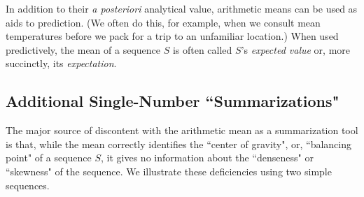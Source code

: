 \bigskip

In addition to their {\em a posteriori} analytical value, arithmetic means can be used as aids to prediction.  (We often do this, for example, when we consult mean temperatures before we pack for a trip to an unfamiliar location.)  When used predictively, the mean of a sequence $S$ is often called $S$'s {\it expected value} or, more succinctly, its {\it expectation}.
 

\subsection{Additional Single-Number ``Summarizations"}
\label{sec:median-mode}

The major source of discontent with the arithmetic mean as a summarization tool is that, while the mean correctly identifies the ``center of gravity", or, ``balancing point" of a sequence $S$, it gives no information about the ``denseness" or ``skewness" of the sequence.  We illustrate these deficiencies using two simple sequences.
  
